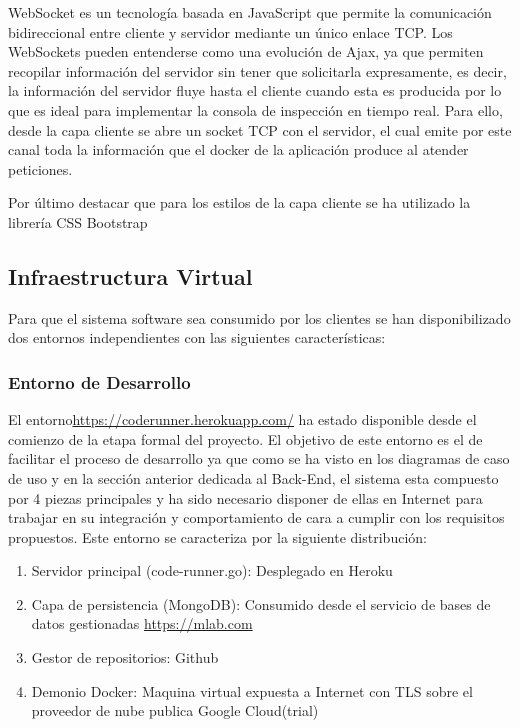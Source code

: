 \documentclass[a4paper,11pt]{book}
\begin{document}
WebSocket es un tecnología basada en JavaScript que permite la comunicación bidireccional entre cliente y servidor mediante un único enlace TCP. Los WebSockets pueden entenderse como una evolución de Ajax, ya que permiten recopilar información del servidor sin tener que solicitarla expresamente, es decir, la información del servidor fluye hasta el cliente cuando esta es producida por lo que es ideal para implementar la consola de inspección en tiempo real. Para ello, desde la capa cliente se abre un socket TCP con el servidor, el cual emite por este canal toda la información que el docker de la aplicación produce al atender peticiones.  

Por último destacar que para los estilos de la capa cliente se ha utilizado la librería CSS Bootstrap~\cite{boot}

\subsection{Infraestructura Virtual}\label{iv}

Para que el sistema software sea consumido por los clientes se han disponibilizado dos entornos independientes con las siguientes características:

\subsubsection{Entorno de Desarrollo}

El entorno\url{https://coderunner.herokuapp.com/} ha estado disponible desde el comienzo de la etapa formal del proyecto. El objetivo de este entorno es el de facilitar el proceso de desarrollo ya que  como se ha visto en los diagramas de caso de uso y en la sección anterior dedicada al Back-End, el sistema esta compuesto por 4 piezas principales y ha sido necesario disponer de ellas en Internet para trabajar en su integración y comportamiento de cara a cumplir con los requisitos propuestos. Este entorno se caracteriza por la siguiente distribución: 


\begin{enumerate}
\item Servidor principal (code-runner.go): Desplegado en Heroku~\cite{hero}
\item Capa de persistencia (MongoDB): Consumido desde el servicio de bases de datos gestionadas \url{https://mlab.com}
\item Gestor de repositorios: Github~\cite{github}
\item Demonio Docker: Maquina virtual expuesta a Internet con TLS sobre el proveedor de nube publica Google Cloud(trial)~\cite{gcp}
\end{enumerate}
\end{document}
